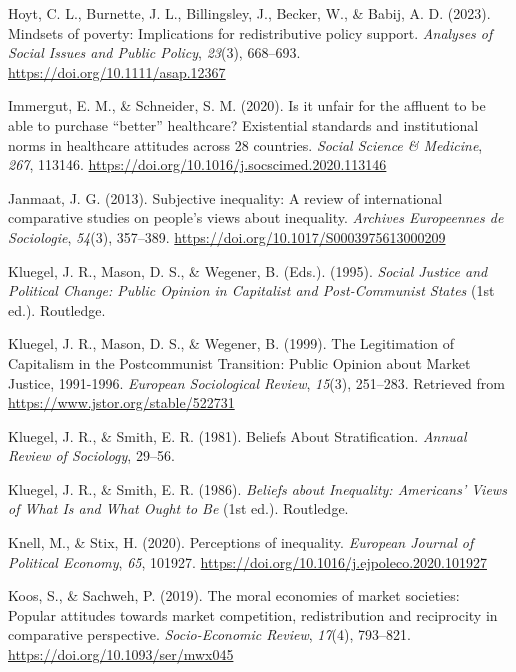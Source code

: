 \documentclass[
  12pt,
]{article}
\newlength{\cslhangindent}
\newenvironment{CSLReferences}[2] %
 {\begin{list}{}{%
  \setlength{\itemindent}{0pt}
  \setlength{\leftmargin}{0pt}
  \setlength{\parsep}{0pt}
  \ifodd #1
   \setlength{\leftmargin}{\cslhangindent}
   \setlength{\itemindent}{-1\cslhangindent}
  \fi
  \setlength{\itemsep}{#2\baselineskip}}}
 {\end{list}}
\begin{document}
\begin{CSLReferences}{1}{0}
Hoyt, C. L., Burnette, J. L., Billingsley, J., Becker, W., \& Babij, A.
D. (2023). Mindsets of poverty: {Implications} for redistributive policy
support. \emph{Analyses of Social Issues and Public Policy},
\emph{23}(3), 668--693. \url{https://doi.org/10.1111/asap.12367}

Immergut, E. M., \& Schneider, S. M. (2020). Is it unfair for the
affluent to be able to purchase {``better''} healthcare? {Existential}
standards and institutional norms in healthcare attitudes across 28
countries. \emph{Social Science \& Medicine}, \emph{267}, 113146.
\url{https://doi.org/10.1016/j.socscimed.2020.113146}

Janmaat, J. G. (2013). Subjective inequality: {A} review of
international comparative studies on people's views about inequality.
\emph{Archives Europeennes de Sociologie}, \emph{54}(3), 357--389.
\url{https://doi.org/10.1017/S0003975613000209}

Kluegel, J. R., Mason, D. S., \& Wegener, B. (Eds.). (1995).
\emph{Social {Justice} and {Political Change}: {Public Opinion} in
{Capitalist} and {Post-Communist States}} (1st ed.). Routledge.

Kluegel, J. R., Mason, D. S., \& Wegener, B. (1999). The {Legitimation}
of {Capitalism} in the {Postcommunist Transition}: {Public Opinion}
about {Market Justice}, 1991-1996. \emph{European Sociological Review},
\emph{15}(3), 251--283. Retrieved from
\url{https://www.jstor.org/stable/522731}

Kluegel, J. R., \& Smith, E. R. (1981). Beliefs {About Stratification}.
\emph{Annual Review of Sociology}, 29--56.

Kluegel, J. R., \& Smith, E. R. (1986). \emph{Beliefs about
{Inequality}: {Americans}' {Views} of {What Is} and {What Ought} to
{Be}} (1st ed.). Routledge.

Knell, M., \& Stix, H. (2020). Perceptions of inequality. \emph{European
Journal of Political Economy}, \emph{65}, 101927.
\url{https://doi.org/10.1016/j.ejpoleco.2020.101927}

Koos, S., \& Sachweh, P. (2019). The moral economies of market
societies: Popular attitudes towards market competition, redistribution
and reciprocity in comparative perspective. \emph{Socio-Economic
Review}, \emph{17}(4), 793--821.
\url{https://doi.org/10.1093/ser/mwx045}


\end{CSLReferences}
\end{document}

